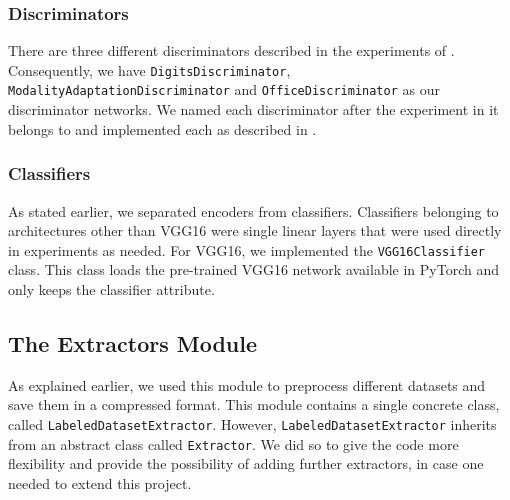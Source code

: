 \documentclass[14pt]{extarticle}
\begin{document}
		\subsubsection{Discriminators}
		There are three different discriminators described in the experiments of \cite{adda}. Consequently, we have \texttt{DigitsDiscriminator},  \texttt{ModalityAdaptationDiscriminator} and \texttt{OfficeDiscriminator} as our discriminator networks. We named each discriminator after the experiment in \cite{adda} it belongs to and implemented each as described in \cite{adda}.
		\subsubsection{Classifiers}
		As stated earlier, we separated encoders from classifiers. Classifiers belonging to architectures other than VGG16 were single linear layers that were used directly in experiments as needed. For VGG16, we implemented the \texttt{VGG16Classifier} class. This class loads the pre-trained VGG16 network available in PyTorch and only keeps the classifier attribute.
		\subsection{The Extractors Module}
		As explained earlier, we used this module to preprocess different datasets and save them in a compressed format. This module contains a single concrete class, called \texttt{LabeledDatasetExtractor}. However, \texttt{LabeledDatasetExtractor} inherits from an abstract class called \texttt{Extractor}. We did so to give the code more flexibility and provide the possibility of adding further extractors, in case one needed to extend this project.
\end{document}
